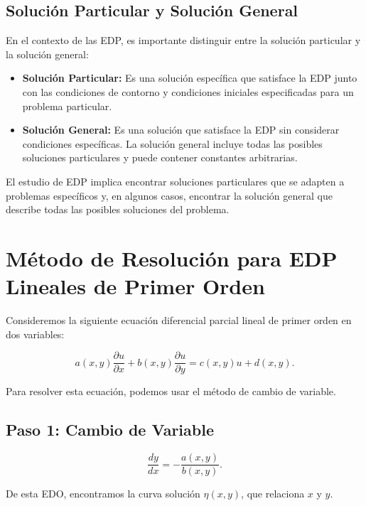 \documentclass[11pt]{book}
\theoremstyle{plain}
\theoremstyle{definition}
\begin{document}
\subsection*{Solución Particular y Solución General}

En el contexto de las EDP, es importante distinguir entre la solución particular y la solución general:

\begin{itemize}
    \item \textbf{Solución Particular:} Es una solución específica que satisface la EDP junto con las condiciones de contorno y condiciones iniciales especificadas para un problema particular.
    
    \item \textbf{Solución General:} Es una solución que satisface la EDP sin considerar condiciones específicas. La solución general incluye todas las posibles soluciones particulares y puede contener constantes arbitrarias.
\end{itemize}

El estudio de EDP implica encontrar soluciones particulares que se adapten a problemas específicos y, en algunos casos, encontrar la solución general que describe todas las posibles soluciones del problema.

\newpage
\section{Método de Resolución para EDP Lineales de Primer Orden}

Consideremos la siguiente ecuación diferencial parcial lineal de primer orden en dos variables:

\setcounter{equation}{0}
\begin{equation}
a(x, y) \frac{\partial u}{\partial x} + b(x, y) \frac{\partial u}{\partial y} = c(x, y) u + d(x,y).
\end{equation}

Para resolver esta ecuación, podemos usar el método de cambio de variable.

\subsection*{Paso 1: Cambio de Variable}

\begin{equation}
\frac{dy}{dx} = -\frac{a(x, y)}{b(x, y)}.
\end{equation}

De esta EDO, encontramos la curva solución $\eta(x, y)$, que relaciona $x$ y $y$.
\end{document}
